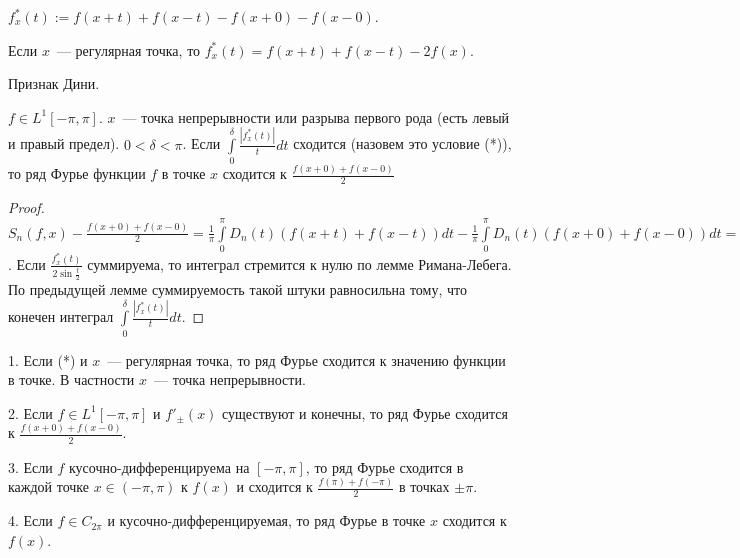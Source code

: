 \begin{designation}
    $f_x^*(t) := f(x + t) + f(x - t) - f(x + 0) - f(x - 0)$.

    Если $x$~--- регулярная точка, то $f_x^*(t) = f(x + t) + f(x - t) - 2f(x)$.
\end{designation}

\begin{theorem} Признак Дини.

    $f \in L^1[-\pi, \pi]$. $x$~--- точка непрерывности или разрыва первого рода (есть левый и правый предел).
    $0 < \delta < \pi$. Если $\int \limits_{0}^{\delta} \frac{|f_x^*(t)|}{t} dt$ сходится (назовем это условие (*)), то ряд Фурье функции $f$ в точке $x$ сходится
    к $\frac{f(x + 0) + f(x - 0)}{2}$
\end{theorem}

\begin{proof}
    $S_n(f, x) - \frac{f(x + 0) + f(x - 0)}{2} = \frac{1}{\pi} \int \limits_{0}^{\pi} D_n(t) (f(x + t) + f(x - t)) dt -
        \frac{1}{\pi} \int \limits_{0}^{\pi} D_n(t) (f(x + 0) + f(x - 0)) dt = \frac{1}{\pi} \int \limits_{0}^{\pi} D_n(t) f_x^*(t) dt =
        \frac{1}{\pi} \int \limits_{0}^{\pi} \frac{f_x^*(t)}{2 \sin \frac{t}{2}} \sin (n + \frac{1}{2}) t dt$.
    Если $\frac{f_x^*(t)}{2 \sin \frac{t}{2}}$ суммируема, то интеграл стремится к нулю по лемме Римана-Лебега.
    По предыдущей лемме суммируемость такой штуки равносильна тому, что конечен интеграл
    $\int \limits_{0}^{\delta} \frac{|f_x^*(t)|}{t} dt$.
\end{proof}

\begin{consequence}
    1. Если (*) и $x$~--- регулярная точка, то ряд Фурье сходится к значению функции в точке. В частности $x$~--- точка непрерывности.

    2. Если $f \in L^1 [-\pi, \pi]$ и $f'_{\pm}(x)$ существуют и конечны, то ряд Фурье сходится к $\frac{f(x + 0) + f(x - 0)}{2}$.

    3. Если $f$ кусочно-дифференцируема на $[-\pi, \pi]$, то ряд Фурье сходится в каждой точке $x \in (-\pi, \pi)$ к $f(x)$ и сходится к $\frac{f(\pi) + f(-\pi)}{2}$ в точках $\pm \pi$.

    4. Если $f \in C_{2 \pi}$ и кусочно-дифференцируемая, то ряд Фурье в точке $x$ сходится к $f(x)$.
\end{consequence}

